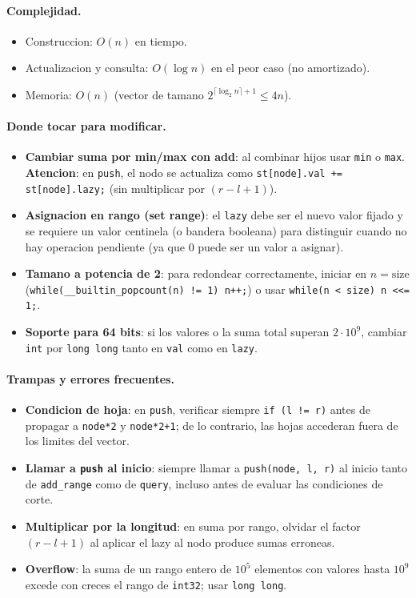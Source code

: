 \paragraph{Complejidad.}
\begin{itemize}\setlength\itemsep{0pt}
	\item Construccion: $O(n)$ en tiempo.
	\item Actualizacion y consulta: $O(\log n)$ en el peor caso (no amortizado).
	\item Memoria: $O(n)$ (vector de tamano $2^{\lceil \log_2 n \rceil + 1} \le 4n$).
\end{itemize}

\paragraph{Donde tocar para modificar.}
\begin{itemize}\setlength\itemsep{0pt}
	\item \textbf{Cambiar suma por min/max con add}: al combinar hijos usar \texttt{min} o \texttt{max}. \textbf{Atencion}: en \texttt{push}, el nodo se actualiza como \texttt{st[node].val += st[node].lazy;} (sin multiplicar por $(r - l + 1)$).
	\item \textbf{Asignacion en rango (set range)}: el \texttt{lazy} debe ser el nuevo valor fijado y se requiere un valor centinela (o bandera booleana) para distinguir cuando no hay operacion pendiente (ya que $0$ puede ser un valor a asignar).
	\item \textbf{Tamano a potencia de 2}: para redondear correctamente, iniciar en $n = \text{size}$ (\texttt{while(\_\_builtin\_popcount(n) != 1) n++;}) o usar \texttt{while(n < size) n <<= 1;}.
	\item \textbf{Soporte para 64 bits}: si los valores o la suma total superan $2 \cdot 10^9$, cambiar \texttt{int} por \texttt{long long} tanto en \texttt{val} como en \texttt{lazy}.
\end{itemize}

\paragraph{Trampas y errores frecuentes.}
\begin{itemize}\setlength\itemsep{0pt}
	\item \textbf{Condicion de hoja}: en \texttt{push}, verificar siempre \texttt{if (l != r)} antes de propagar a \texttt{node*2} y \texttt{node*2+1}; de lo contrario, las hojas accederan fuera de los limites del vector.
	\item \textbf{Llamar a \texttt{push} al inicio}: siempre llamar a \texttt{push(node, l, r)} al inicio tanto de \texttt{add\_range} como de \texttt{query}, incluso antes de evaluar las condiciones de corte.
	\item \textbf{Multiplicar por la longitud}: en suma por rango, olvidar el factor $(r - l + 1)$ al aplicar el lazy al nodo produce sumas erroneas.
	\item \textbf{Overflow}: la suma de un rango entero de $10^5$ elementos con valores hasta $10^9$ excede con creces el rango de \texttt{int32}; usar \texttt{long long}.
\end{itemize}


